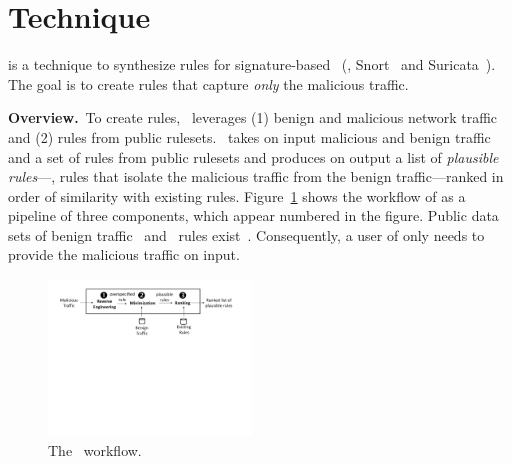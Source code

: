 \documentclass[sigconf,review, anonymous]{acmart}
\begin{document}
\section{Technique}
\label{sec:technique}

\tname{} is a technique to synthesize rules for signature-based
\nids~(\eg{}, Snort~\cite{snort} and Suricata~\cite{suricata}). The
goal is to create rules that capture \emph{only} the
malicious traffic.

\vspace{1ex}
\noindent\textbf{Overview.}~To create rules, \tname\ leverages (1)
benign and malicious network traffic and (2) rules from public
rulesets. \tname\ takes on input malicious and benign traffic and a
set of rules from public rulesets and produces on output a list of
\emph{plausible rules}---\ie{}, rules that isolate the malicious
traffic from the benign traffic---ranked in order of similarity with
existing rules. Figure~\ref{fig:overview} shows the workflow of
\tname{} as a pipeline of three components, which appear numbered in
the figure.  Public data sets of benign
traffic~\cite{tcpreplay,stratosphere-normal} and \nids\ rules
exist~\cite{emerging-threats-open}. Consequently, a user of \tname{}
only needs to provide the malicious traffic on input.

\begin{figure}[h!]
  \centering
  \includegraphics[trim=0 395 50 0,clip,width=0.48\textwidth]{figs/nids-workflow}
  \caption{The \tname\ workflow.}
  \label{fig:overview}
  \vspace{-2ex}
\end{figure}
\end{document}

